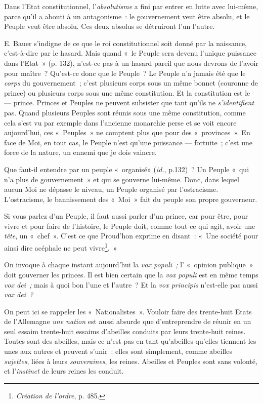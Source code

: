 \documentclass[french,twoside]{book} %
\begin{document}
Dans l’Etat constitutionnel, l’\emph{absolutisme} a fini par entrer en lutte avec lui-même, parce qu’il a abouti à un antagonisme : le gouvernement veut être absolu, et le Peuple veut être absolu. Ces deux absolus se détruiront l’un l’autre.\par
E. Bauer s’indigne de ce que le roi constitutionnel soit donné par la naissance, c’est-à-dire par le hasard. Mais quand « le Peuple sera devenu l’unique puissance dans l’Etat » (p. 132), n’est-ce pas à un hasard pareil que nous devrons de l’avoir pour maître ? Qu’est-ce donc que le Peuple ? Le Peuple n’a jamais été que le \emph{corps} du gouvernement ; c’est plusieurs corps sous un même bonnet (couronne de prince) ou plusieurs corps sous une même constitution. Et la constitution  est le — prince. Princes et Peuples ne peuvent subsister que tant qu’ils ne \emph{s’identifient} pas. Quand plusieurs Peuples sont réunis sous une même constitution, comme cela s’est vu par exemple dans l’ancienne monarchie perse et se voit encore aujourd’hui, ces « Peuples » ne comptent plus que pour des « provinces ». En face de Moi, en tout cas, le Peuple n’est qu’une puissance — fortuite ; c’est une force de la nature, un ennemi que je dois vaincre.\par
Que faut-il entendre par un peuple « organisé» (\emph{id.}, p.132) ? Un Peuple « qui n’a plus de gouvernement » et qui se gouverne lui-même. Donc, dans lequel aucun Moi ne dépasse le niveau, un Peuple organisé par l’ostracisme. L’ostracisme, le bannissement des « Moi » fait du peuple son propre gouverneur.\par
Si vous parlez d’un Peuple, il faut aussi parler d’un prince, car pour être, pour vivre et pour faire de l’histoire, le Peuple doit, comme tout ce qui agit, avoir une \emph{tête}, un « chef ». C’est ce que Proud’hon exprime en disant : « Une société pour ainsi dire acéphale ne peut vivre\footnote{ \noindent \emph{Création de l’ordre}, p. 485.
 }. »\par
On invoque à chaque instant aujourd’hui la \emph{vox populi ;} l’ « opinion publique » doit gouverner les princes. Il est bien certain que la \emph{vox populi} est en même temps \emph{vox dei ;} mais à quoi bon l’une et l’autre ? Et la \emph{vox principis} n’est-elle pas aussi \emph{vox dei ?}\par
On peut ici se rappeler les « Nationalistes ». Vouloir faire des trente-huit Etats de l’Allemagne \emph{une nation }est aussi absurde que d’entreprendre de réunir en un seul essaim trente-huit essaims d’abeilles conduits par leurs trente-huit reines. Toutes sont des abeilles, mais ce n’est pas en tant qu’abeilles qu’elles tiennent les unes aux autres et peuvent s’unir : elles sont simplement, comme abeilles \emph{sujettes}, liées à leurs \emph{souveraines}, les reines. Abeilles et Peuples sont sans  volonté, et l’\emph{instinct} de leurs reines les conduit.\par
\end{document}
